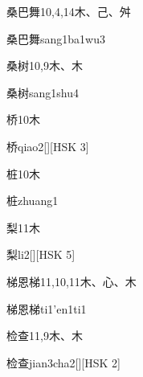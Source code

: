 \begin{entry}{桑巴舞}{10,4,14}{⽊、⼰、⾇}
  \begin{phonetics}{桑巴舞}{sang1ba1wu3}
  \end{phonetics}
\end{entry}

\begin{entry}{桑树}{10,9}{⽊、⽊}
  \begin{phonetics}{桑树}{sang1shu4}
  \end{phonetics}
\end{entry}

\begin{entry}{桥}{10}{⽊}
  \begin{phonetics}{桥}{qiao2}[][HSK 3]
  \end{phonetics}
\end{entry}

\begin{entry}{桩}{10}{⽊}
  \begin{phonetics}{桩}{zhuang1}
  \end{phonetics}
\end{entry}

\begin{entry}{梨}{11}{⽊}
  \begin{phonetics}{梨}{li2}[][HSK 5]
  \end{phonetics}
\end{entry}

\begin{entry}{梯恩梯}{11,10,11}{⽊、⼼、⽊}
  \begin{phonetics}{梯恩梯}{ti1'en1ti1}
  \end{phonetics}
\end{entry}

\begin{entry}{检查}{11,9}{⽊、⽊}
  \begin{phonetics}{检查}{jian3cha2}[][HSK 2]
  \end{phonetics}
\end{entry}

